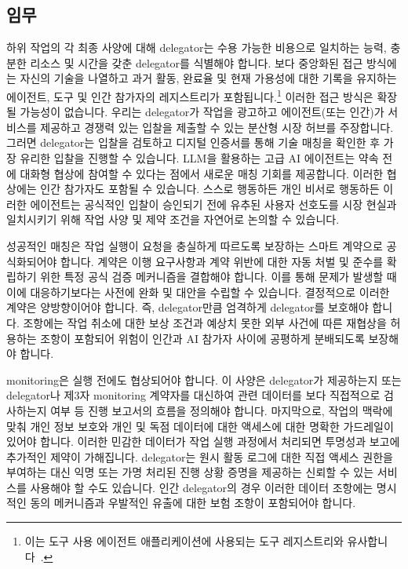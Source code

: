 \documentclass[11pt, a4paper, twocolumn, copyright, goog]{google}
\begin{document}
\subsection{임무}
\label{sec:assign}

하위 작업의 각 최종 사양에 대해 delegator는 수용 가능한 비용으로 일치하는 능력, 충분한 리소스 및 시간을 갖춘 delegator를 식별해야 합니다. 보다 중앙화된 접근 방식에는 자신의 기술을 나열하고 과거 활동, 완료율 및 현재 가용성에 대한 기록을 유지하는 에이전트, 도구 및 인간 참가자의 레지스트리가 포함됩니다.\footnote{이는 도구 사용 에이전트 애플리케이션에 사용되는 도구 레지스트리와 유사합니다~\citep{qin2023toolllmfacilitatinglargelanguage}.} 이러한 접근 방식은 확장될 가능성이 없습니다. 우리는 delegator가 작업을 광고하고 에이전트(또는 인간)가 서비스를 제공하고 경쟁력 있는 입찰을 제출할 수 있는 분산형 \citep{chen2024internetagentsweavingweb} 시장 허브를 주장합니다. 그러면 delegator는 입찰을 검토하고 디지털 인증서를 통해 기술 매칭을 확인한 후 가장 유리한 입찰을 진행할 수 있습니다. LLM을 활용하는 고급 AI 에이전트는 약속 전에 대화형 협상에 참여할 수 있다는 점에서 새로운 매칭 기회를 제공합니다. 이러한 협상에는 인간 참가자도 포함될 수 있습니다. 스스로 행동하든 개인 비서로 행동하든 이러한 에이전트는 공식적인 입찰이 승인되기 전에 유추된 사용자 선호도를 시장 현실과 일치시키기 위해 작업 사양 및 제약 조건을 자연어로 논의할 수 있습니다.

성공적인 매칭은 작업 실행이 요청을 충실하게 따르도록 보장하는 스마트 계약으로 공식화되어야 합니다. 계약은 이행 요구사항과 계약 위반에 대한 자동 처벌 및 준수를 확립하기 위한 특정 공식 검증 메커니즘을 결합해야 합니다. 이를 통해 문제가 발생할 때 이에 대응하기보다는 사전에 완화 및 대안을 수립할 수 있습니다. 결정적으로 이러한 계약은 양방향이어야 합니다. 즉, delegator만큼 엄격하게 delegator를 보호해야 합니다. 조항에는 작업 취소에 대한 보상 조건과 예상치 못한 외부 사건에 따른 재협상을 허용하는 조항이 포함되어 위험이 인간과 AI 참가자 사이에 공평하게 분배되도록 보장해야 합니다.
 
monitoring은 실행 전에도 협상되어야 합니다. 이 사양은 delegator가 제공하는지 또는 delegator나 제3자 monitoring 계약자를 대신하여 관련 데이터를 보다 직접적으로 검사하는지 여부 등 진행 보고서의 흐름을 정의해야 합니다. 마지막으로, 작업의 맥락에 맞춰 개인 정보 보호와 개인 및 독점 데이터에 대한 액세스에 대한 명확한 가드레일이 있어야 합니다. 이러한 민감한 데이터가 작업 실행 과정에서 처리되면 투명성과 보고에 추가적인 제약이 가해집니다. delegator는 원시 활동 로그에 대한 직접 액세스 권한을 부여하는 대신 익명 또는 가명 처리된 진행 상황 증명을 제공하는 신뢰할 수 있는 서비스를 사용해야 할 수도 있습니다. 인간 delegator의 경우 이러한 데이터 조항에는 명시적인 동의 메커니즘과 우발적인 유출에 대한 보험 조항이 포함되어야 합니다.
\end{document}

